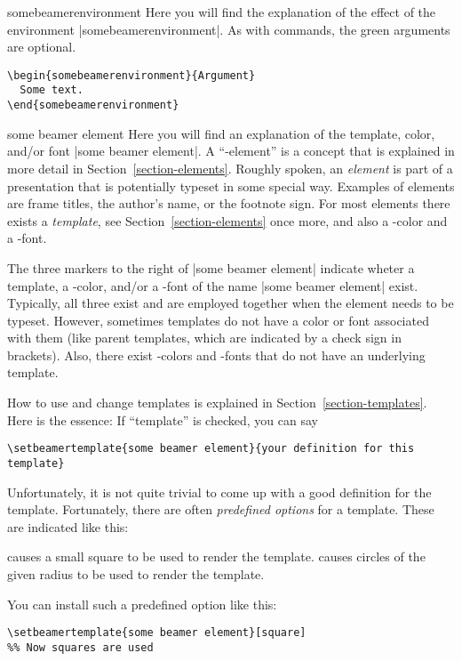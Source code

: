 \begin{environment}{{somebeamerenvironment}}
  Here you will find the explanation of the effect of the environment
  |somebeamerenvironment|. As with commands, the green arguments are
  optional.

  \example
\begin{verbatim}
\begin{somebeamerenvironment}{Argument}
  Some text.
\end{somebeamerenvironment}
\end{verbatim}
\end{environment}

\begin{element}{some beamer element}\yes\yes\yes
  Here you will find an explanation of the template, color,
  and/or font |some beamer element|.
  A ``\beamer-element'' is a concept that is explained in more detail
  in Section~\ref{section-elements}. Roughly spoken, an \emph{element}
  is part of a presentation that is potentially typeset in some
  special way. Examples of elements are frame titles, the author's
  name, or the footnote sign. For most elements there exists a
  \emph{template}, see Section~\ref{section-elements} once more, and
  also a \beamer-color and a \beamer-font.

  The three markers to the right of |some beamer element| indicate
  wheter a template, a \beamer-color, and/or a \beamer-font of the
  name |some beamer element| exist. Typically, all three exist and are
  employed together when the element needs to be typeset. However,
  sometimes templates do not have a color or font associated with them
  (like parent templates, which are indicated by a check sign in
  brackets). Also, there exist \beamer-colors and -fonts that do not
  have an underlying template.

  How to use and change templates is explained in
  Section~\ref{section-templates}. Here is the essence: If
  ``template'' is checked, you can say
\begin{verbatim}
\setbeamertemplate{some beamer element}{your definition for this template}
\end{verbatim}
  Unfortunately, it is not quite trivial to come up with a good definition for
  the template. Fortunately, there are often \emph{predefined options}
  for a template. These are indicated like this:
  \begin{itemize}
    causes a small square to be used to render the template.
    causes circles of the given radius to be used to render the template.
  \end{itemize}
  You can install such a predefined option like this:
\begin{verbatim}
\setbeamertemplate{some beamer element}[square]
%% Now squares are used


\end{verbatim}
\end{element}
